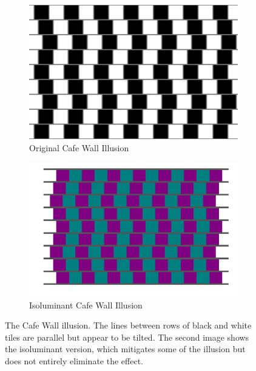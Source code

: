 \documentclass[11pt]{isuthesis}\usepackage[]{graphicx}\usepackage[]{color}
\begin{document}
\begin{figure}[htbp]\centering
\hfil
\begin{subfigure}[b]{.4\textwidth}\centering
  \includegraphics[width=\textwidth]{CafeWall}
  \caption{Original Cafe Wall Illusion}\label{fig:CafeWallOrig}
\end{subfigure}\hfil
\begin{subfigure}[b]{.4\textwidth}\centering
  \includegraphics[width=\textwidth]{fig-cafewall}
  \caption{Isoluminant Cafe Wall Illusion}\label{fig:CafeWallIso}
\end{subfigure}\hfil
\caption[Cafe Wall Illusion]{The Cafe Wall illusion. The lines between rows of black and white tiles are parallel but appear to be tilted. The second image shows the isoluminant version, which mitigates some of the illusion but does not entirely eliminate the effect.}\label{fig:cafewall}
\end{figure}
\end{document}
